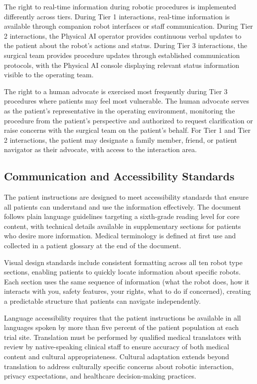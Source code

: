 The right to real-time information during robotic procedures is implemented
differently across tiers. During Tier 1 interactions, real-time information is
available through companion robot interfaces or staff communication. During
Tier 2 interactions, the Physical AI operator provides continuous verbal
updates to the patient about the robot's actions and status. During Tier 3
interactions, the surgical team provides procedure updates through established
communication protocols, with the Physical AI console displaying relevant
status information visible to the operating team.

The right to a human advocate is exercised most frequently during Tier 3
procedures where patients may feel most vulnerable. The human advocate serves
as the patient's representative in the operating environment, monitoring the
procedure from the patient's perspective and authorized to request
clarification or raise concerns with the surgical team on the patient's behalf.
For Tier 1 and Tier 2 interactions, the patient may designate a family member,
friend, or patient navigator as their advocate, with access to the interaction
area.

\subsection{Communication and Accessibility Standards}
\label{subsec:instructions-accessibility}

The patient instructions are designed to meet accessibility standards that
ensure all patients can understand and use the information effectively. The
document follows plain language guidelines targeting a sixth-grade reading
level for core content, with technical details available in supplementary
sections for patients who desire more information. Medical terminology is
defined at first use and collected in a patient glossary at the end of the
document.

Visual design standards include consistent formatting across all ten robot type
sections, enabling patients to quickly locate information about specific robots.
Each section uses the same sequence of information (what the robot does, how it
interacts with you, safety features, your rights, what to do if concerned),
creating a predictable structure that patients can navigate independently.

Language accessibility requires that the patient instructions be available in
all languages spoken by more than five percent of the patient population at
each trial site. Translation must be performed by qualified medical translators
with review by native-speaking clinical staff to ensure accuracy of both
medical content and cultural appropriateness. Cultural adaptation extends
beyond translation to address culturally specific concerns about robotic
interaction, privacy expectations, and healthcare decision-making practices.

